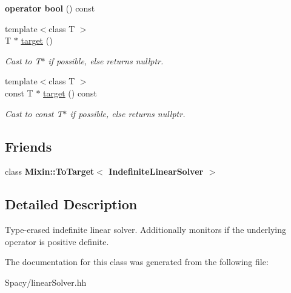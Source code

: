 \begin{DoxyCompactItemize}
\item 
\hypertarget{classSpacy_1_1IndefiniteLinearSolver_a6c21bb7747e484a3177efb2cd24df410}{}{\bfseries operator bool} () const \label{classSpacy_1_1IndefiniteLinearSolver_a6c21bb7747e484a3177efb2cd24df410}

\item 
\hypertarget{structSpacy_1_1Mixin_1_1ToTarget_a3510786172c63a074eda127276d13392}{}{\footnotesize template$<$class T $>$ }\\T $\ast$ \hyperlink{structSpacy_1_1Mixin_1_1ToTarget_a3510786172c63a074eda127276d13392}{target} ()\label{structSpacy_1_1Mixin_1_1ToTarget_a3510786172c63a074eda127276d13392}

\begin{DoxyCompactList}\small\item\em Cast to T$\ast$ if possible, else returns nullptr. \end{DoxyCompactList}\item 
\hypertarget{structSpacy_1_1Mixin_1_1ToTarget_a98985b22f6fc98d253c8416c54a5e359}{}{\footnotesize template$<$class T $>$ }\\const T $\ast$ \hyperlink{structSpacy_1_1Mixin_1_1ToTarget_a98985b22f6fc98d253c8416c54a5e359}{target} () const \label{structSpacy_1_1Mixin_1_1ToTarget_a98985b22f6fc98d253c8416c54a5e359}

\begin{DoxyCompactList}\small\item\em Cast to const T$\ast$ if possible, else returns nullptr. \end{DoxyCompactList}\end{DoxyCompactItemize}
\subsection*{Friends}
\begin{DoxyCompactItemize}
\item 
\hypertarget{classSpacy_1_1IndefiniteLinearSolver_ac9c0b106218450fc273444c515916ab7}{}class {\bfseries Mixin\+::\+To\+Target$<$ Indefinite\+Linear\+Solver $>$}\label{classSpacy_1_1IndefiniteLinearSolver_ac9c0b106218450fc273444c515916ab7}

\end{DoxyCompactItemize}


\subsection{Detailed Description}
Type-\/erased indefinite linear solver. Additionally monitors if the underlying operator is positive definite. 

The documentation for this class was generated from the following file\+:\begin{DoxyCompactItemize}
\item 
Spacy/linear\+Solver.\+hh\end{DoxyCompactItemize}
